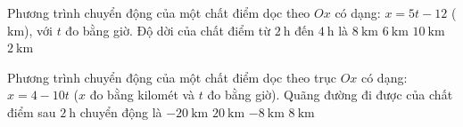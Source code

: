 \begin{ex}
	{Phương trình chuyển động của một chất điểm dọc theo $Ox$ có dạng: $x=5t-12$ ($\si{\kilo\meter}$), với $t$ đo bằng giờ. Độ dời của chất điểm từ $\SI{2}{\hour}$ đến $\SI{4}{\hour}$ là
		\choice
		{$\SI{8}{\kilo\meter}$}
		{$\SI{6}{\kilo\meter}$}
		{\True $\SI{10}{\kilo\meter}$}
		{$\SI{2}{\kilo\meter}$}
	}
	\loigiai{}
\end{ex}

\begin{ex}
	{Phương trình chuyển động của một chất điểm dọc theo trục $Ox$ có dạng: $x = 4 -10t$ ($x$ đo bằng kilomét và $t$ đo bằng giờ). Quãng đường đi được của chất điểm sau $\SI{2}{\hour}$ chuyển động là
		\choice
		{$\SI{-20}{\kilo\meter}$}
		{\True $\SI{20}{\kilo\meter}$}
		{$\SI{-8}{\kilo\meter}$}
		{$\SI{8}{\kilo\meter}$}
	}
	\loigiai{}
\end{ex}

\begin{ex}
	\loigiai{}
\end{ex}

